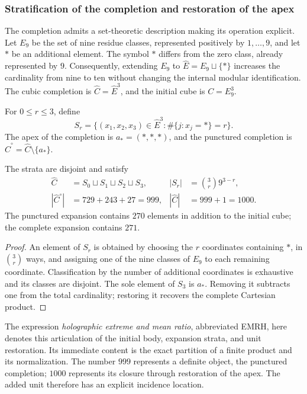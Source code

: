 \subsubsection{Stratification of the completion and restoration of the apex}
\label{sec:revision-emrh}

The completion admits a set-theoretic description making its operation
explicit. Let \(E_9\) be the set of nine residue classes, represented
positively by \(1,\ldots,9\), and let \(\ast\) be an additional element.
The symbol \(\ast\) differs from the zero class, already represented by \(9\).
Consequently, extending \(E_9\) to
\(\widehat E=E_9\sqcup\{\ast\}\) increases the cardinality from nine
to ten without changing the internal modular identification. The cubic
completion is \(\widehat C=\widehat E^3\), and the initial cube is \(C=E_9^3\).

\begin{definition}
For \(0\leq r\leq3\), define
\[
 S_r=\{(x_1,x_2,x_3)\in\widehat E^3:
             \#\{j:x_j=\ast\}=r\}.
\]
The apex of the completion is \(a_\ast=(\ast,\ast,\ast)\), and the
punctured completion is \(\widehat C^{\circ}=\widehat C\setminus\{a_\ast\}\).
\end{definition}

\begin{proposition}
The strata are disjoint and satisfy
\begin{align}
 \widehat C&=S_0\sqcup S_1\sqcup S_2\sqcup S_3,
 &|S_r|&=\binom3r9^{3-r},\label{eq:revision-estratos}\\
 |\widehat C^{\circ}|&=729+243+27=999,
 &|\widehat C|&=999+1=1000.\label{eq:revision-999}
\end{align}
The punctured expansion contains \(270\) elements in addition to the
initial cube; the complete expansion contains \(271\).
\end{proposition}
\begin{proof}
An element of \(S_r\) is obtained by choosing the \(r\) coordinates
containing \(\ast\), in \(\binom3r\) ways, and assigning one of the
nine classes of \(E_9\) to each remaining coordinate. Classification by
the number of additional coordinates is exhaustive and its classes are
disjoint. The sole element of \(S_3\) is \(a_\ast\). Removing it
subtracts one from the total cardinality; restoring it recovers the
complete Cartesian product.
\end{proof}

The expression \emph{holographic extreme and mean ratio}, abbreviated EMRH,
here denotes this articulation of the initial body, expansion
strata, and unit restoration. Its immediate content is the exact partition
of a finite product and its normalization. The number \(999\) represents
a definite object, the punctured completion; \(1000\) represents its
closure through restoration of the apex. The added unit therefore has
an explicit incidence location.

